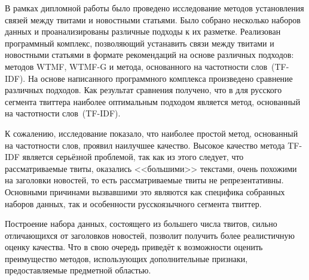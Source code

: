 \conclusiontitle
    В рамках дипломной работы было проведено исследование методов установления связей между твитами и новостными статьями.
    Было собрано несколько наборов данных и проанализированы различные подходы к их разметке.
    Реализован программный комплекс, позволяющий устанавить связи между твитами и новостными статьями в формате рекомендаций на основе различных подходов: методов WTMF, WTMF-G и метода, основанного на частотности слов~(TF-IDF).
    На основе написанного программного комплекса произведено сравнение различных подходов.
    Как результат сравнения получено, что в для русского сегмента твиттера наиболее оптимальным подходом является метод, основанный на частотности слов~(TF-IDF).

    К сожалению, исследование показало, что наиболее простой метод, основанный на частотности слов, проявил наилучшее качество.
    Высокое качество метода TF-IDF является серьёзной проблемой, так как из этого следует, что рассматриваемые твиты,
    оказались <<большими>> текстами, очень похожими на заголовки новостей, то есть рассматриваемые твиты не репрезентативны.
    Основными причинами вызвавшими это являются как специфика собранных наборов данных, так и особенности русскоязычного сегмента твиттер.

    Построение набора данных, состоящего из большего числа твитов, сильно отличающихся от заголовков новостей, позволит
    получить более реалистичную оценку качества. Что в свою очередь приведёт к возможности оценить преимущество методов,
    использующих дополнительные признаки, предоставляемые предметной областью.
    